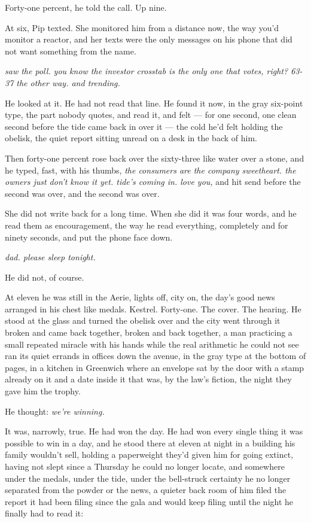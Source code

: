 \documentclass[11pt,openany]{book}
\newcommand{\scenebreak}{\par\vspace{0.5\baselineskip}\begin{center}\textasteriskcentered\quad\textasteriskcentered\quad\textasteriskcentered\end{center}\vspace{0.5\baselineskip}\par}
\begin{document}
Forty-one percent, he told the call. Up nine.


\scenebreak


At six, Pip texted. She monitored him from a distance now, the way you'd monitor a reactor, and her texts were the only messages on his phone that did not want something from the name.

\textit{saw the poll. you know the investor crosstab is the only one that votes, right? 63-37 the other way. and trending.}

He looked at it. He had not read that line. He found it now, in the gray six-point type, the part nobody quotes, and read it, and felt --- for one second, one clean second before the tide came back in over it --- the cold he'd felt holding the obelisk, the quiet report sitting unread on a desk in the back of him.

Then forty-one percent rose back over the sixty-three like water over a stone, and he typed, fast, with his thumbs, \textit{the consumers are the company sweetheart. the owners just don't know it yet. tide's coming in. love you,} and hit send before the second was over, and the second was over.

She did not write back for a long time. When she did it was four words, and he read them as encouragement, the way he read everything, completely and for ninety seconds, and put the phone face down.

\textit{dad. please sleep tonight.}


\scenebreak


He did not, of course.

At eleven he was still in the Aerie, lights off, city on, the day's good news arranged in his chest like medals. Kestrel. Forty-one. The cover. The hearing. He stood at the glass and turned the obelisk over and the city went through it broken and came back together, broken and back together, a man practicing a small repeated miracle with his hands while the real arithmetic he could not see ran its quiet errands in offices down the avenue, in the gray type at the bottom of pages, in a kitchen in Greenwich where an envelope sat by the door with a stamp already on it and a date inside it that was, by the law's fiction, the night they gave him the trophy.

He thought: \textit{we're winning.}

It was, narrowly, true. He had won the day. He had won every single thing it was possible to win in a day, and he stood there at eleven at night in a building his family wouldn't sell, holding a paperweight they'd given him for going extinct, having not slept since a Thursday he could no longer locate, and somewhere under the medals, under the tide, under the bell-struck certainty he no longer separated from the powder or the news, a quieter back room of him filed the report it had been filing since the gala and would keep filing until the night he finally had to read it:
\end{document}
